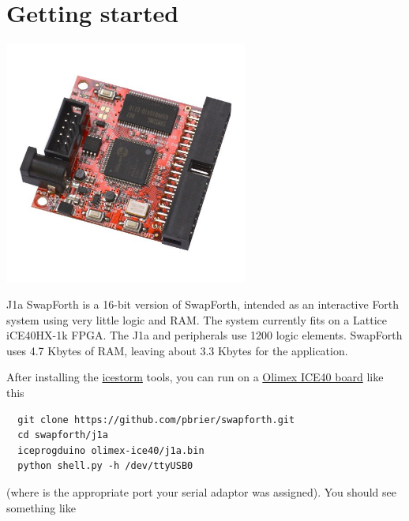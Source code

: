\endgroup

\thispagestyle{empty}
\pagestyle{headings}

\tableofcontents

\chapter{Getting started}

\begin{center}
\includegraphics[width=0.6\textwidth]{iCE40HX1K-EVB-1.jpg}
\end{center}

J1a SwapForth is a 16-bit version of SwapForth,
intended as an interactive Forth system using very little logic and RAM.
The system currently fits on a Lattice iCE40HX-1k FPGA. 
The J1a and peripherals use 1200 logic elements.
SwapForth uses 4.7 Kbytes of RAM,
leaving about 3.3 Kbytes for the application. 

After installing the    
\href{http://www.clifford.at/icestorm/}{icestorm}
tools, you can run on a
\href{https://www.olimex.com/Products/FPGA/iCE40/iCE40HX1K-EVB/open-source-hardware}{Olimex ICE40 board}
like this

\begin{framed}
\begin{Verbatim}
  git clone https://github.com/pbrier/swapforth.git
  cd swapforth/j1a
  iceprogduino olimex-ice40/j1a.bin
  python shell.py -h /dev/ttyUSB0
\end{Verbatim}
\end{framed}

\noindent
(where  is the appropriate port your serial adaptor was assigned).
You should see something like


